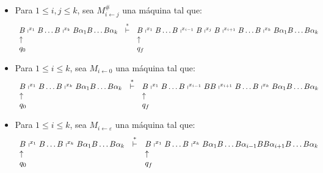 \begin{frame}
  \begin{itemize}
    \item Para $1 \leq i,j \leq k$, sea $M_{i\leftarrow j}^{\#}$ una máquina tal que:
    \[
      \begin{array}{lcl}
        B \shortmid^{x_{1}} B \dotsc B \shortmid^{x_{k}} B \alpha_{1} B \dotsc B \alpha_{k} &\overset{\ast}{\vdash}& B
          \shortmid^{x_{1}} B \dotsc B \shortmid^{x_{i-1}} B \shortmid^{x_{j}} B \shortmid^{x_{i+1}} B \dotsc B
          \shortmid^{x_{k}} B \alpha_{1} B \dotsc B \alpha_{k} \\
        \uparrow && \uparrow \\
        q_{0} & & q_{f}
      \end{array}
    \]

    \item Para $1 \leq i \leq k$, sea $M_{i\leftarrow 0}$ una máquina tal que:
    \[
      \begin{array}{lcl}
        B \shortmid^{x_{1}} B \dotsc B \shortmid^{x_{k}} B \alpha_{1} B \dotsc B \alpha_{k} &\overset{\ast}{\vdash}& B
          \shortmid^{x_{1}} B \dotsc B \shortmid^{x_{i-1}} B B \shortmid^{x_{i+1}} B \dotsc B \shortmid^{x_{k}} B
          \alpha_{1} B \dotsc B \alpha_{k} \\
        \uparrow && \uparrow \\
        q_{0} & & q_{f}
      \end{array}
    \]

    \item Para $1 \leq i \leq k$, sea $M_{i\leftarrow \varepsilon}$ una máquina tal que:
    \[
      \begin{array}{lcl}
        B \shortmid^{x_{1}} B \dotsc B \shortmid^{x_{k}} B \alpha_{1} B \dotsc B \alpha_{k} &\overset{\ast}{\vdash}& B
          \shortmid^{x_{1}} B \dotsc B \shortmid^{x_{k}} B \alpha_{1} B \dotsc B \alpha_{i-1} B B \alpha_{i+1} B \dotsc
          B \alpha_{k} \\
        \uparrow && \uparrow \\
        q_{0} & & q_{f}
      \end{array}
    \]
  \end{itemize}
\end{frame}
